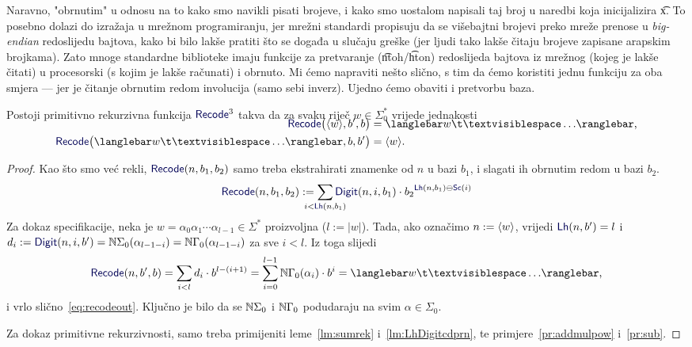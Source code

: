 Naravno, "obrnutim" u odnosu na to kako smo navikli pisati brojeve, i kako smo uostalom napisali taj broj u naredbi koja inicijalizira \t x. To posebno dolazi do izražaja u mrežnom programiranju, jer mrežni standardi propisuju da se višebajtni brojevi preko mreže prenose u \emph{big-endian} redoslijedu bajtova, kako bi bilo lakše pratiti što se događa u slučaju greške (jer ljudi tako lakše čitaju brojeve zapisane arapskim brojkama). Zato mnoge standardne biblioteke imaju funkcije za pretvaranje (\t{ntoh}/\t{hton}) redoslijeda bajtova iz mrežnog (kojeg je lakše čitati) u procesorski (s kojim je lakše računati) i obrnuto. Mi ćemo napraviti nešto slično, s tim da ćemo koristiti jednu funkciju za oba smjera --- jer je čitanje obrnutim redom involucija (samo sebi inverz). Ujedno ćemo obaviti i pretvorbu baza.

\begin{lema}\label{lm:recodeprn}
Postoji primitivno rekurzivna funkcija $\f{Recode}^3$ takva da za svaku riječ $w\in\Sigma_0^*$ vrijede jednakosti
\begin{align}
\SwapAboveDisplaySkip
    \label{eq:recodein}\f{Recode}\bigl(\kr w,b',b\bigr)&=\knk{w\bl\ldots}\text,\\
    \label{eq:recodeout}\f{Recode}\bigl(\knk{w\bl\ldots},b,b'\bigr)&=\kr w\text.
\end{align}
\end{lema}
\begin{proof}
Kao što smo već rekli, $\f{Recode}(n,b_1,b_2)$ samo treba ekstrahirati znamenke od $n$ u bazi $b_1$, i slagati ih obrnutim redom u bazi $b_2$.
\begin{equation}
    \f{Recode}(n,b_1,b_2):=\sum_{\mathclap{i<\f{Lh}(n,b_1)}}\f{Digit}(n,i,b_1)\cdot{b_2}^{\f{Lh}(n,b_1)\ominus\f{Sc}(i)}
\end{equation}
Za dokaz specifikacije, neka je $w=\alpha_0\alpha_1\dotsm\alpha_{l-1}\in\Sigma^*$ proizvoljna ($l:=\left|w\right|$). Tada, ako označimo $n:=\langle w\rangle$, vrijedi $\f{Lh}(n,b')=l$ i $d_i:=\f{Digit}(n,i,b')=\N\Sigma_0(\alpha_{l-1-i})=\N\Gamma_0(\alpha_{l-1-i})$ za sve $i<l$. Iz toga slijedi
\begin{equation}
    \f{Recode}(n,b',b)=\sum_{i<l}d_i\cdot b^{l-(i+1)}=\sum_{i=0}^{l-1}\N\Gamma_0(\alpha_i)\cdot b^i=\knk{w\bl\ldots}\text,
\end{equation}
i vrlo slično~\eqref{eq:recodeout}. Ključno je bilo da se ${\mathbb N}\Sigma_0$ i ${\mathbb N}\Gamma_0$ podudaraju na svim $\alpha\in\Sigma_0$.

Za dokaz primitivne rekurzivnosti, samo treba primijeniti leme~\ref{lm:sumrek} i~\ref{lm:LhDigitcdprn}, te primjere~\ref{pr:addmulpow} i~\ref{pr:sub}.
\end{proof}


